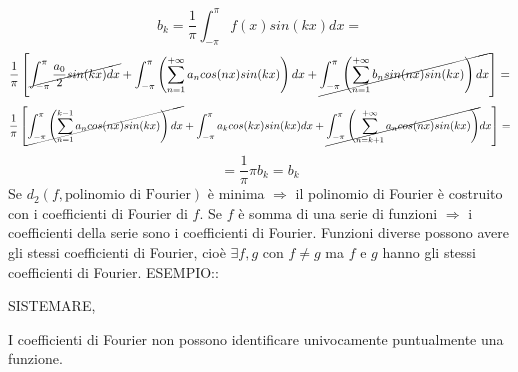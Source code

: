 $$b_k=\frac{1}{\pi}\int_{-\pi}^{\pi}f(x)sin(kx)dx=$$
$$\frac{1}{\pi}\left[
\cancel{\int_{-\pi}^{\pi}\frac{a_0}{2}sin(kx)dx}+
\int_{-\pi}^{\pi}\left(\sum\limits_{n=1}^{+\infty}a_ncos(nx)sin(kx)\right)dx+
\cancel{\int_{-\pi}^{\pi}\left(\sum\limits_{n=1}^{+\infty}b_nsin(nx)sin(kx)\right)dx}
\right]=$$
$$\frac{1}{\pi}\left[
\cancel{\int_{-\pi}^{\pi}\left(\sum\limits_{n=1}^{k-1} a_ncos(nx)sin(kx)\right)dx}+
\int_{-\pi}^{\pi}a_kcos(kx)sin(kx)dx+
\cancel{\int_{-\pi}^{\pi}\left(\sum\limits_{n=k+1}^{+\infty}a_ncos(nx)sin(kx)\right)}dx
\right]=$$
$$=\frac{1}{\pi}\pi b_k=b_k$$
\observation
Se $d_2(f,\text{polinomio di Fourier})$ \`{e} minima $\Rightarrow$ il polinomio di Fourier \`{e} costruito con i coefficienti di Fourier di $f$.
\observation
Se $f$ \`{e} somma di una serie di funzioni $\Rightarrow$ i coefficienti della serie sono i coefficienti di Fourier.
\observation
Funzioni diverse possono avere gli stessi coefficienti di Fourier, cio\`{e} $\exists f,g$ con $f\ne g$ ma $f$ e $g$  hanno gli stessi coefficienti di Fourier.
ESEMPIO::
\begin{center}
	SISTEMARE,
\end{center}
\observation
I coefficienti di Fourier non possono identificare univocamente puntualmente una funzione.
